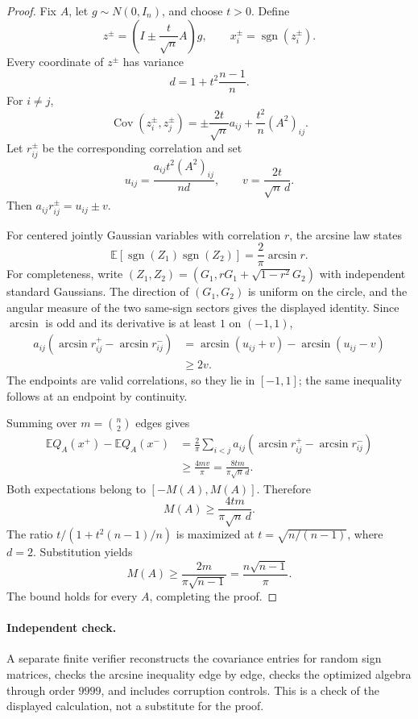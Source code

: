 \documentclass[11pt]{article}
\newcommand{\E}{\mathbb E}
\begin{document}
\begin{proof}
Fix \(A\), let \(g\sim N(0,I_n)\), and choose \(t>0\). Define
\[
 z^\pm=\left(I\pm\frac{t}{\sqrt n}A\right)g,
 \qquad x_i^\pm=\operatorname{sgn}(z_i^\pm).
\]
Every coordinate of \(z^\pm\) has variance
\[
 d=1+t^2\frac{n-1}{n}.
\]
For \(i\ne j\),
\[
 \operatorname{Cov}(z_i^\pm,z_j^\pm)
 =\pm\frac{2t}{\sqrt n}a_{ij}
   +\frac{t^2}{n}(A^2)_{ij}.
\]
Let \(r_{ij}^\pm\) be the corresponding correlation and set
\[
 u_{ij}=\frac{a_{ij}t^2(A^2)_{ij}}{nd},
 \qquad
 v=\frac{2t}{\sqrt n\,d}.
\]
Then \(a_{ij}r_{ij}^\pm=u_{ij}\pm v\).

For centered jointly Gaussian variables with correlation \(r\), the
arcsine law states
\[
 \E[\operatorname{sgn}(Z_1)\operatorname{sgn}(Z_2)]
 =\frac2\pi\arcsin r.
\]
For completeness, write
\((Z_1,Z_2)=(G_1,rG_1+\sqrt{1-r^2}G_2)\) with independent standard
Gaussians. The direction of \((G_1,G_2)\) is uniform on the circle, and
the angular measure of the two same-sign sectors gives the displayed
identity.
Since \(\arcsin\) is odd and its derivative is at least \(1\) on
\((-1,1)\),
\[
\begin{aligned}
a_{ij}\left(\arcsin r_{ij}^+-\arcsin r_{ij}^-\right)
 &=\arcsin(u_{ij}+v)-\arcsin(u_{ij}-v)\\
 &\ge 2v.
\end{aligned}
\]
The endpoints are valid correlations, so they lie in \([-1,1]\); the
same inequality follows at an endpoint by continuity.

Summing over \(m=\binom n2\) edges gives
\[
\begin{aligned}
\E Q_A(x^+)-\E Q_A(x^-)
 &=\frac2\pi\sum_{i<j}a_{ij}
   \left(\arcsin r_{ij}^+-\arcsin r_{ij}^-\right)\\
 &\ge\frac{4mv}{\pi}
 =\frac{8tm}{\pi\sqrt n\,d}.
\end{aligned}
\]
Both expectations belong to \([-M(A),M(A)]\). Therefore
\[
 M(A)\ge\frac{4tm}{\pi\sqrt n\,d}.
\]
The ratio \(t/(1+t^2(n-1)/n)\) is maximized at
\(t=\sqrt{n/(n-1)}\), where \(d=2\). Substitution yields
\[
 M(A)\ge \frac{2m}{\pi\sqrt{n-1}}
 =\frac{n\sqrt{n-1}}{\pi}.
\]
The bound holds for every \(A\), completing the proof.
\end{proof}

\paragraph{Independent check.}
A separate finite verifier reconstructs the covariance entries for
random sign matrices, checks the arcsine inequality edge by edge, checks
the optimized algebra through order \(9999\), and includes corruption
controls. This is a check of the displayed calculation, not a substitute
for the proof.
\end{document}

